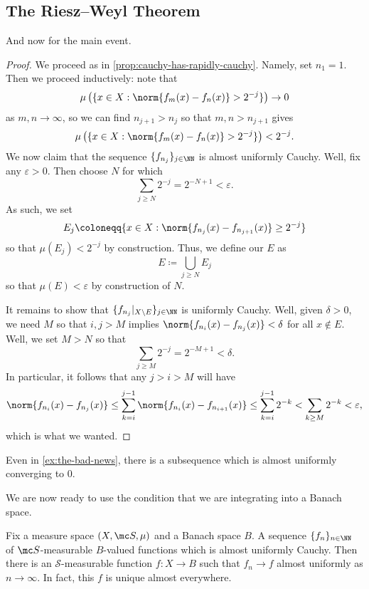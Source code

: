 \documentclass[../notes.tex]{subfiles}
\begin{document}
\subsection{The Riesz--Weyl Theorem}
And now for the main event.
\rwthm*
\begin{proof}
	We proceed as in \autoref{prop:cauchy-has-rapidly-cauchy}. Namely, set $n_1=1$. Then we proceed inductively: note that
	\[\mu\left(\{x\in X:\norm{f_m(x)-f_n(x)}>2^{-j}\}\right)\to0\]
	as $m,n\to\infty$, so we can find $n_{j+1}>n_j$ so that $m,n>n_{j+1}$ gives
	\[\mu\left(\{x\in X:\norm{f_m(x)-f_n(x)}>2^{-j}\}\right)<2^{-j}.\]
	We now claim that the sequence $\{f_{n_j}\}_{j\in\NN}$ is almost uniformly Cauchy. Well, fix any $\varepsilon>0$. Then choose $N$ for which
	\[\sum_{j\ge N}2^{-j}=2^{-N+1}<\varepsilon.\]
	As such, we set
	\[E_j\coloneqq\{x\in X:\norm{f_{n_j}(x)-f_{n_{j+1}}(x)}\ge2^{-j}\}\]
	so that $\mu(E_j)<2^{-j}$ by construction. Thus, we define our $E$ as
	\[E\coloneqq\bigcup_{j\ge N}E_j\]
	so that $\mu(E)<\varepsilon$ by construction of $N$.

	It remains to show that $\{f_{n_j}|_{X\setminus E}\}_{j\in\NN}$ is uniformly Cauchy. Well, given $\delta>0$, we need $M$ so that $i,j>M$ implies $\norm{f_{n_i}(x)-f_{n_j}(x)}<\delta$ for all $x\notin E$. Well, we set $M>N$ so that
	\[\sum_{j\ge M}2^{-j}=2^{-M+1}<\delta.\]
	In particular, it follows that any $j>i>M$ will have
	\[\norm{f_{n_i}(x)-f_{n_j}(x)}\le\sum_{k=i}^{j-1}\norm{f_{n_i}(x)-f_{n_{i+1}}(x)}\le\sum_{k=i}^{j-1}2^{-k}<\sum_{k\ge M}2^{-k}<\varepsilon,\]
	which is what we wanted.
\end{proof}
\begin{example}
	Even in \autoref{ex:the-bad-news}, there is a subsequence which is almost uniformly converging to $0$.
\end{example}
We are now ready to use the condition that we are integrating into a Banach space.
\begin{lemma}
	Fix a measure space $(X,\mc S,\mu)$ and a Banach space $B$. A sequence $\{f_n\}_{n\in\NN}$ of $\mc S$-measurable $B$-valued functions which is almost uniformly Cauchy. Then there is an $\mathcal S$-measurable function $f\colon X\to B$ such that $f_n\to f$ almost uniformly as $n\to\infty$. In fact, this $f$ is unique almost everywhere.
\end{lemma}
\end{document}
